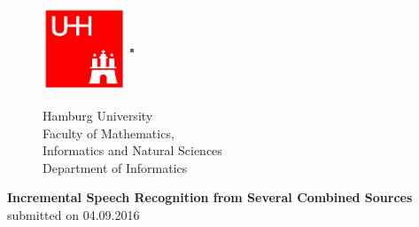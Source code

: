 %
%

\begin{titlepage}

  \setcounter{page}{-1}

	\begin{figure}[h]
		\begin{minipage}[b]{25mm}
			\includegraphics[width=25mm,clip]{images/logo_uhh}
		\end{minipage}
		\begin{minipage}[b]{2mm}
			\includegraphics[width=1mm,height=24mm]{images/greypixel}
		\end{minipage}
		\begin{minipage}[b]{12 cm}
			{\sffamily
				{\Large Hamburg University } \\
				Faculty of Mathematics,\\
				Informatics and Natural Sciences \\
				Department of Informatics \\
			}
		\end{minipage}
	\end{figure}

	\vfill
	
	\begin{center}
		\vspace{14mm}
		\noindent \textbf{\Large
		  Incremental Speech Recognition from Several Combined Sources \\		  
		}
		\vspace{10mm}
		submitted on 04.09.2016
		\noindent {\large
		
		}
	\end{center}
	
	\vfill
	

\end{titlepage}
